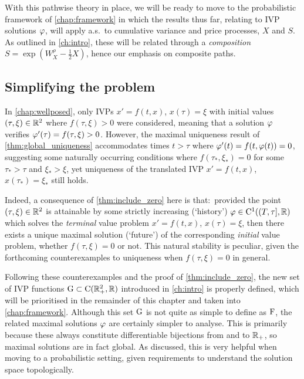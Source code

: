 With this pathwise theory in place, we will be ready to move to the probabilistic framework of \autoref{chap:framework} in which the results thus far, relating to IVP solutions $\varphi$, will apply a.s.~to cumulative variance and price processes, $X$ and $S$. As outlined in \autoref{ch:intro}, these will be related through a \emph{composition} $S=\exp(W^\rho_X-\frac12 X)$, hence our emphasis on composite paths.

\subsection{Simplifying the problem}\label{sec:refining_problem}

In \autoref{chap:wellposed}, only IVPs $x'=f(t,x)$, $x(\tau)=\xi$ with initial values $(\tau,\xi)\in\mathbb{R}^2$ where $f(\tau,\xi)>0$ were considered, meaning that a solution $\varphi$ verifies $\varphi'(\tau)=f(\tau,\xi)>0$. However, the maximal uniqueness result of \autoref{thm:global_uniqueness} accommodates times $t>\tau$ where $\varphi'(t)=f(t,\varphi(t))=0$, suggesting some naturally occurring conditions where $f(\tau_*,\xi_*)=0$ for some $\tau_*>\tau$ and $\xi_*>\xi$, yet uniqueness of the translated IVP $x'=f(t,x)$, $x(\tau_*)=\xi_*$ still holds.

Indeed, a consequence of \autoref{thm:include_zero} here is that:~provided the point $(\tau,\xi)\in\mathbb{R}^2$ is attainable by some strictly increasing (`history') $\varphi\in\mathrm{C}^1((T,\tau],\mathbb{R})$ which solves the \emph{terminal} value problem $x'=f(t,x)$, $x(\tau)=\xi$, then there exists a unique maximal solution (`future') of the corresponding \emph{initial} value problem, whether $f(\tau,\xi)=0$ or not. This natural stability is peculiar, given the forthcoming counterexamples to uniqueness when $f(\tau,\xi)=0$ in general.

Following these counterexamples and the proof of \autoref{thm:include_zero}, the new set of IVP functions $\mathrm{G}\subset\mathrm{C}(\mathbb{R}_+^2,\mathbb{R})$ introduced in \autoref{ch:intro} is properly defined, which will be prioritised in the remainder of this chapter and taken into \autoref{chap:framework}. Although this set $\mathrm{G}$ is not quite as simple to define as $\mathrm{F}$, the related maximal solutions $\varphi$ are certainly simpler to analyse. This is primarily because these always constitute differentiable bijections from and to $\mathbb{R}_+$, so maximal solutions are in fact global. As discussed, this is very helpful when moving to a probabilistic setting, given requirements to understand the solution space topologically.

